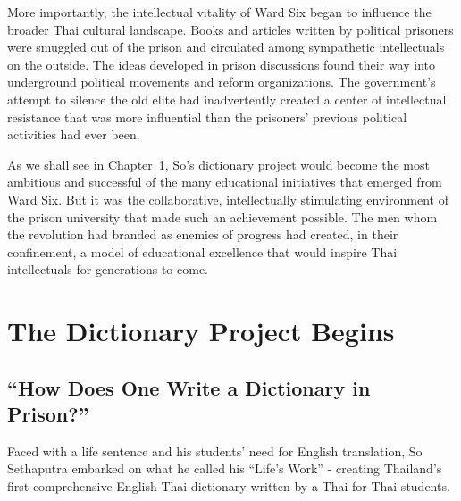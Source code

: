 \documentclass[
  Letterpaper,
]{scrbook}
\begin{document}
More importantly, the intellectual vitality of Ward Six began to
influence the broader Thai cultural landscape. Books and articles
written by political prisoners were smuggled out of the prison and
circulated among sympathetic intellectuals on the outside. The ideas
developed in prison discussions found their way into underground
political movements and reform organizations. The government's attempt
to silence the old elite had inadvertently created a center of
intellectual resistance that was more influential than the prisoners'
previous political activities had ever been.

As we shall see in Chapter~\ref{sec-dictionary-begins}, So's dictionary
project would become the most ambitious and successful of the many
educational initiatives that emerged from Ward Six. But it was the
collaborative, intellectually stimulating environment of the prison
university that made such an achievement possible. The men whom the
revolution had branded as enemies of progress had created, in their
confinement, a model of educational excellence that would inspire Thai
intellectuals for generations to come.


\chapter{The Dictionary Project Begins}\label{sec-dictionary-begins}

\section{``How Does One Write a Dictionary in
Prison?''}\label{how-does-one-write-a-dictionary-in-prison}

Faced with a life sentence and his students' need for English
translation, So Sethaputra embarked on what he called his ``Life's
Work'' - creating Thailand's first comprehensive English-Thai dictionary
written by a Thai for Thai students.
\end{document}
